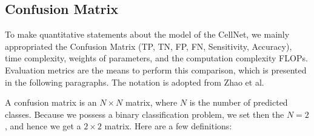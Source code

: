 \subsection{Confusion Matrix}
To make quantitative statements about the model of the CellNet, we mainly appropriated the  Confusion Matrix (TP, TN, FP, FN, Sensitivity, Accuracy), time complexity, weights of parameters, and the computation complexity FLOPs. 
Evaluation metrics are the means to perform this comparison, which is presented in the following paragraphs. The notation is adopted from Zhao et al.

A confusion matrix is an $N \times N $ matrix, where $ N $ is the number of predicted classes. Because we possess a binary classification problem, we set then the $N=2$, and hence we get a $2 \times 2$ matrix. Here are a few definitions:


\begin{table}[h]
\centering
{}

\caption{\textbf{The illustration of  Confusion Matrix}. We will use the precision and recall as evaluation matrix in our experiments.}

\end{table}

